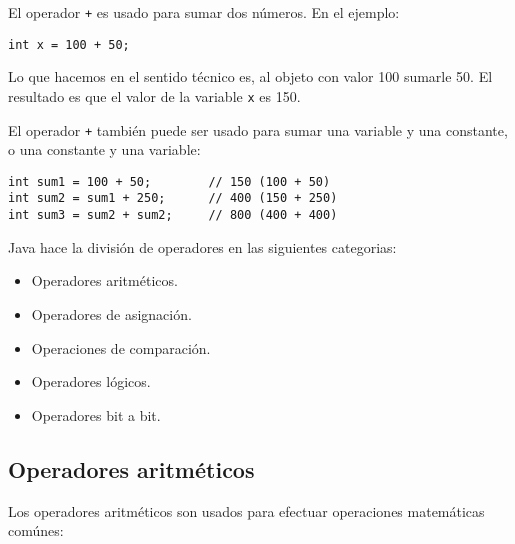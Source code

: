 \documentclass[12pt]{article}
\theoremstyle{largebreak}
\begin{document}
    \begin{exa}
        El operador \lstinline|+| es usado para sumar dos números. En el ejemplo:
        \begin{lstlisting}[caption={Suma de enteros.},label=DescriptiveLabel]
int x = 100 + 50;
        \end{lstlisting}
        Lo que hacemos en el sentido técnico es, al objeto con valor 100 sumarle 50. El resultado es que el valor de la variable \lstinline|x| es 150.
    \end{exa}

    El operador \lstinline|+| también puede ser usado para sumar una variable y una constante, o una constante y una variable:

    \begin{lstlisting}[caption={Sumas de variables y constantes.},label=DescriptiveLabel]
int sum1 = 100 + 50;        // 150 (100 + 50)
int sum2 = sum1 + 250;      // 400 (150 + 250)
int sum3 = sum2 + sum2;     // 800 (400 + 400)
    \end{lstlisting}

    Java hace la división de operadores en las siguientes categorias:
    \begin{itemize}
        \item Operadores aritméticos.
        \item Operadores de asignación.
        \item Operaciones de comparación.
        \item Operadores lógicos.
        \item Operadores bit a bit.
    \end{itemize}

    \subsection{Operadores aritméticos}

    Los operadores aritméticos son usados para efectuar operaciones matemáticas comúnes:
\end{document}

